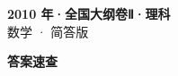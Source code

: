 \documentclass[zihao=-4, a4paper]{ctexart}
\begin{document}
\begin{center}
  {\Large\bfseries 2010 年·全国大纲卷Ⅱ·理科}\\[4pt]
  {\large 数学 · 简答版}
\end{center}
\medskip
{}

\clearpage
{}
\begin{center}{\Large\bfseries 答案速查}\end{center}
\medskip

\end{document}
